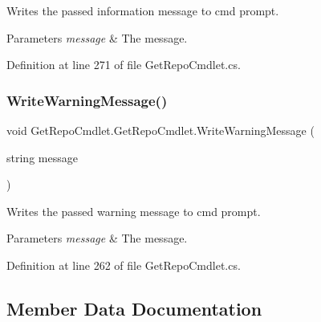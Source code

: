 Writes the passed information message to cmd prompt. 


\begin{DoxyParams}{Parameters}
{\em message} & The message.\\
\hline
\end{DoxyParams}


Definition at line 271 of file Get\+Repo\+Cmdlet.\+cs.

\mbox{\label{class_get_repo_cmdlet_1_1_get_repo_cmdlet_abd3278e2a9e0b1a3ac95dfee3eeb6bdc}} 
\subsubsection{\texorpdfstring{Write\+Warning\+Message()}{WriteWarningMessage()}}
{\footnotesize\ttfamily void Get\+Repo\+Cmdlet.\+Get\+Repo\+Cmdlet.\+Write\+Warning\+Message (\begin{DoxyParamCaption}\item[{string}]{message }\end{DoxyParamCaption})\hspace{0.3cm}{\ttfamily [private]}}



Writes the passed warning message to cmd prompt. 


\begin{DoxyParams}{Parameters}
{\em message} & The message.\\
\hline
\end{DoxyParams}


Definition at line 262 of file Get\+Repo\+Cmdlet.\+cs.



\subsection{Member Data Documentation}
\mbox{\label{class_get_repo_cmdlet_1_1_get_repo_cmdlet_a822f61308706124cb1f17d9cd1af1092}} 
